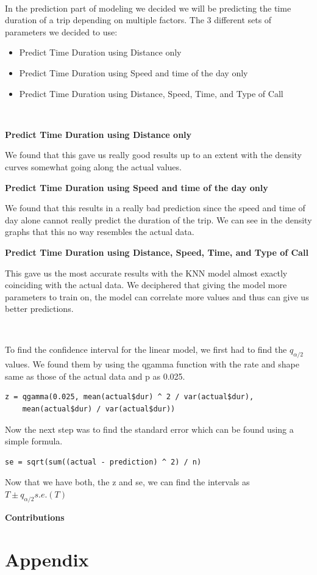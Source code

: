 \documentclass[11pt]{article}
\begin{document}
\\
\par
In the prediction part of modeling we decided we will be predicting the time duration of a trip depending on multiple factors. The 3 different sets of parameters we decided to use:
\begin{itemize}
	\item Predict Time Duration using Distance only
	\item Predict Time Duration using Speed and time of the day only
	\item Predict Time Duration using Distance, Speed, Time, and Type of Call
\end{itemize}

\\
\par
\textbf{Predict Time Duration using Distance only}
\par
We found that this gave us really good results up to an extent with the density curves somewhat going along the actual values.

\textbf{Predict Time Duration using Speed and time of the day only}
\par
We found that this results in a really bad prediction since the speed and time of day alone cannot really predict the duration of the trip. We can see in the density graphs that this no way resembles the actual data.

\textbf{Predict Time Duration using Distance, Speed, Time, and Type of Call}
\par
This gave us the most accurate results with the KNN model almost exactly coinciding with the actual data. We deciphered that giving the model more parameters to train on, the model can correlate more values and thus can give us better predictions.

\\
\par
To find the confidence interval for the linear model, we first had to find the $q_{\alpha/2}$ values. We found them by using the qgamma function with the rate and shape same as those of the actual data and p as 0.025.
\begin{lstlisting}
z = qgamma(0.025, mean(actual$dur) ^ 2 / var(actual$dur), 
    mean(actual$dur) / var(actual$dur))
\end{lstlisting}
\par
Now the next step was to find the standard error which can be found using a simple formula.
\begin{lstlisting}
se = sqrt(sum((actual - prediction) ^ 2) / n)
\end{lstlisting}
Now that we have both, the z and se, we can find the intervals as $T \pm q_{\alpha/2} s.e.(T)$

\textbf{Contributions}
\par

\appendix
\section*{Appendix}

\end{document}

